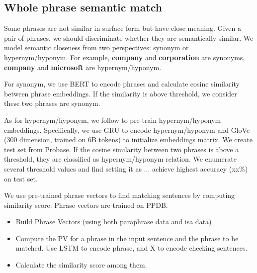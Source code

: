 \subsection{Whole phrase semantic match}
\label{sec:semantic}
Some phrases are not similar in surface form but have close meaning. Given a pair of phrases, we should discriminate whether they are semantically similar. We model semantic closeness from two perspectives: synonym or hypernym/hyponym. For example, \textbf{company} and \textbf{corporation} are synonyms, \textbf{company} and \textbf{microsoft} are hypernym/hyponym. 

For synonym, we use BERT\cite{devlin2018bert} to encode phrases and calculate cosine similarity between phrase embeddings. If the similarity is above threshold, we consider these two phrases are synonym.

As for hypernym/hyponym, we follow \cite{yu2015learning} to pre-train hypernym/hyponym embeddings. Specifically, we use GRU to encode hypernym/hyponym and GloVe\cite{pennington2014glove} (300 dimension, trained on 6B tokens) to initialize embeddings matrix. We create test set from Probase\cite{wu2012probase}. If the cosine similarity between two phrases is above a threshold, they are classified as hypernym/hyponym relation. We enumerate several threshold values and find setting it as ... achieve highest accuracy (xx\%) on test set. 

We use pre-trained phrase vectors to find matching sentences by computing similarity score. Phrase vectors are trained on PPDB. 
\begin{itemize}
\item Build Phrase Vectors (using both paraphrase data and isa data)
\item Compute the PV for a phrase in the input sentence and the phrase
to be matched. Use LSTM to encode phrase, and X to encode checking sentences.
\item Calculate the similarity score among them.
\end{itemize}




